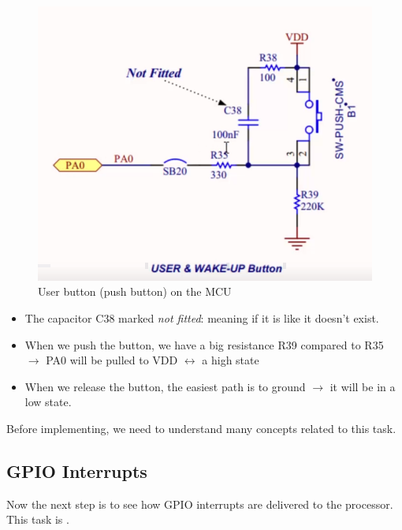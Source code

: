 \begin{figure}[h]
\centering
\includegraphics[scale=0.5]{Figures/driver_part_1/push_button_schematic}
\caption{User button (push button) on the MCU}
\label{fig:driver_part_1:user_button}
\end{figure}

	\begin{itemize}
	
	\item The capacitor C38 marked \textit{not fitted}: meaning if it is like it doesn't exist.
	
	\item When we push the button, we have a big resistance R39 compared to R35 $\rightarrow$ PA0 will be pulled to VDD $\leftrightarrow$ a high state
	
	\item When we release the button, the easiest path is to ground $\rightarrow$ it will be in a low state.
		
	
	\end{itemize}

Before implementing, we need to understand many concepts related to this task.

\newpage
\subsection{GPIO Interrupts}

Now the next step is to see how GPIO interrupts are delivered to the processor. This task is .

